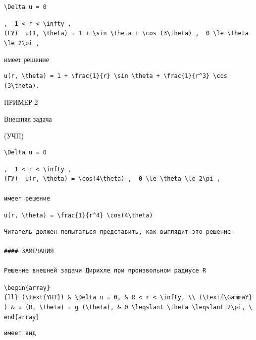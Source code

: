 \documentclass[
  ukrainian,
]{article}
\begin{document}
\texttt{\textbackslash{}Delta\ u\ =\ 0}

\texttt{,\ \ \textquotesingle{}1\ \textless{}\ r\ \textless{}\ \textbackslash{}infty\textquotesingle{}\ ,}
\texttt{(ГУ)\ \ \textquotesingle{}u(1,\ \textbackslash{}theta)\ =\ 1\ +\ \textbackslash{}sin\ \textbackslash{}theta\ +\ \textbackslash{}cos\ (3\textbackslash{}theta)\textquotesingle{}\ ,\ \ \textquotesingle{}0\ \textbackslash{}le\ \textbackslash{}theta\ \textbackslash{}le\ 2\textbackslash{}pi\textquotesingle{}\ ,}

имеет решение

\begin{verbatim}
u(r, \theta) = 1 + \frac{1}{r} \sin \theta + \frac{1}{r^3} \cos (3\theta).
\end{verbatim}

ПРИМЕР 2

Внешняя задача

(УЧП)

\begin{verbatim}
\Delta u = 0
\end{verbatim}

\begin{verbatim}
,  1 < r < \infty ,  
(ГУ)  u(r, \theta) = \cos(4\theta) ,  0 \le \theta \le 2\pi ,

имеет решение
\end{verbatim}

\texttt{u(r,\ \textbackslash{}theta)\ =\ \textbackslash{}frac\{1\}\{r\^{}4\}\ \textbackslash{}cos(4\textbackslash{}theta)}

\begin{verbatim}
Читатель должен попытаться представить, как выглядит это решение

#### ЗАМЕЧАНИЯ

Решение внешней задачи Дирихле при произвольном радиусе R
\end{verbatim}

\texttt{\textbackslash{}begin\{array\}\{ll\}\ (\textbackslash{}text\{YHI\})\ \&\ \textbackslash{}Delta\ u\ =\ 0,\ \&\ R\ \textless{}\ r\ \textless{}\ \textbackslash{}infty,\ \textbackslash{}\textbackslash{}\ (\textbackslash{}text\{\textbackslash{}GammaY\})\ \&\ u\ (R,\ \textbackslash{}theta)\ =\ g\ (\textbackslash{}theta),\ \&\ 0\ \textbackslash{}leqslant\ \textbackslash{}theta\ \textbackslash{}leqslant\ 2\textbackslash{}pi,\ \textbackslash{}end\{array\}}

\begin{verbatim}
имеет вид
\end{verbatim}
\end{document}
